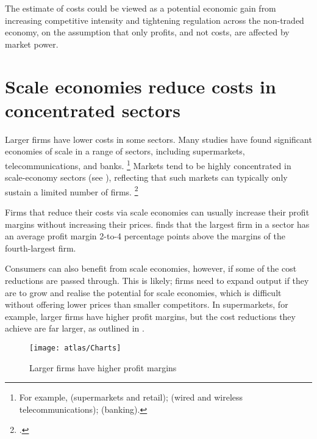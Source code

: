 The estimate of costs could be viewed as a potential economic gain from increasing competitive intensity and tightening regulation across the non-traded economy, on the assumption that only profits, and not costs, are affected by market power.

\clearpage
\section{Scale economies reduce costs in concentrated sectors}

Larger firms have lower costs in some sectors.
Many studies have found significant economies of scale in a range of sectors, including supermarkets, telecommunications, and banks.%
    \footnote{For example, \textcites{ellickson2007does}{keh2003retail}{guy2005scale} (supermarkets and retail); \textcites{bloch2001economies}{nam2009estimating} (wired and wireless telecommunications); \textcites{allen2007efficiency}{hughes2013said} (banking).}
Markets tend to be highly concentrated in scale-economy sectors (see ), reflecting that such markets can typically only sustain a limited number of firms.%
    \footcite{shaked-sutton1983natural-oligopolies}

Firms that reduce their costs via scale economies can usually increase their profit margins without increasing their prices.
 finds that the largest firm in a sector has an average profit margin 2-to-4 percentage points above the margins of the fourth-largest firm.

Consumers can also benefit from scale economies, however, if some of the cost reductions are passed through.
This is likely; firms need to expand output if they are to grow and realise the potential for scale economies, which is difficult without offering lower prices than smaller competitors.
In supermarkets, for example, larger firms have higher profit margins, but the cost reductions they achieve are far larger, as outlined in .

\begin{figure}
    \caption{Larger firms have higher profit margins \label{fig:profit_margins_rank}}
    \texttt{[image: atlas/Charts]} 
\end{figure}


